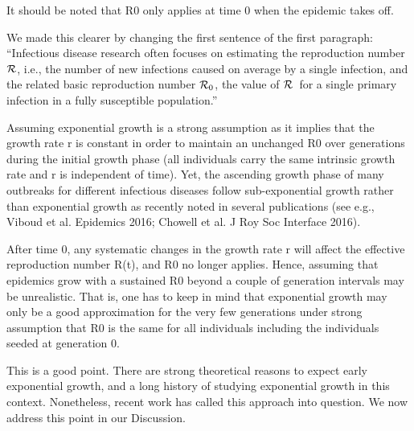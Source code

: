 \documentclass[12pt]{article}
\newcommand{\RR}{\ensuremath{{\cal R}}}
\newcommand{\Rx}[1]{\ensuremath{{\cal R}_{#1}}}
\newcommand{\Ro}{\Rx{0}}
\newcommand{\revtext}{\textsf}
\begin{document}
\revtext{It should be noted that R0 only applies at time 0 when the epidemic takes off.}

We made this clearer by changing the first sentence of the first paragraph: ``Infectious disease research often focuses on estimating the reproduction number \RR, i.e., the number of new infections caused on average by a single infection, and the related basic reproduction number \Ro, the value of \RR\ for a single primary infection in a fully susceptible population.''

\revtext{Assuming exponential growth is a strong assumption as it
implies that the growth rate r is constant in order to maintain an
unchanged R0 over generations during the initial growth phase (all
individuals carry the same intrinsic growth rate and r is independent
of time). Yet, the ascending growth phase of many outbreaks for
different infectious diseases follow sub-exponential growth rather
than exponential growth as recently noted in several publications
(see e.g.,  Viboud et al. Epidemics 2016; Chowell et al. J Roy Soc
Interface 2016).}

\revtext{After time 0, any systematic changes in the growth rate r will
affect the effective reproduction number R(t), and R0 no longer
applies.  Hence, assuming that epidemics grow with a sustained R0
beyond a couple of generation intervals may be unrealistic. That is,
one has to keep in mind that exponential growth may only be a good
approximation for the very few generations under strong assumption
that R0 is the same for all individuals including the individuals
seeded at generation 0.}

This is a good point. There are strong theoretical reasons to expect early exponential growth, and a long history of studying exponential growth in this context. Nonetheless, recent work has called this approach into question. We now address this point in our Discussion.
\end{document}
